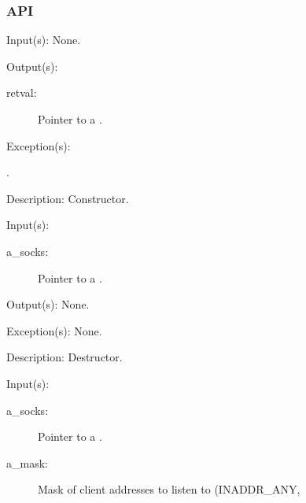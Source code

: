 \subsubsection{API}
\begin{capi}
\label{socks_new}
	\begin{capilist}
	\item[Input(s): ] None.
	\item[Output(s): ]
		\begin{description}\item[]
		\item[retval: ]
			Pointer to a .
		\end{description}
	\item[Exception(s): ]
		\begin{description}\item[]
		\item[.]
		\end{description}
	\item[Description: ]
		Constructor.
	\end{capilist}
\label{socks_delete}
	\begin{capilist}
	\item[Input(s): ]
		\begin{description}\item[]
		\item[a\_socks: ]
			Pointer to a \classname{socks}.
		\end{description}
	\item[Output(s): ] None.
	\item[Exception(s): ] None.
	\item[Description: ]
		Destructor.
	\end{capilist}
\label{socks_listen}
	\begin{capilist}
	\item[Input(s): ]
		\begin{description}\item[]
		\item[a\_socks: ]
			Pointer to a .
		\item[a\_mask: ]
			Mask of client addresses to listen to (INADDR\_ANY,

\end{description}
\end{capilist}
\end{capi}
